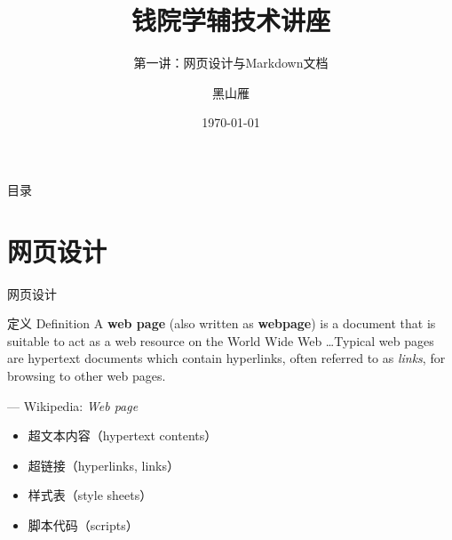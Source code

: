\documentclass{beamer}
\title[Tech Lec]{钱院学辅技术讲座}
\subtitle{第一讲：网页设计与Markdown文档}
\author[xjtu-blacksmith]{黑山雁}
\institute[Xi'an Jiaotong University]
{
  西安交通大学
}
\date{\today}
\begin{document}
\begin{frame}
\maketitle
\end{frame}

\begin{frame}{目录}
    \tableofcontents
\end{frame}

\section{网页设计}
\begin{frame}{网页设计}
\begin{block}{定义 Definition}
A \textbf{web page} (also written as \textbf{webpage}) is a document that is
suitable to act as a web resource on the World Wide Web \ldots Typical web pages
are hypertext documents which contain hyperlinks, often referred to as \emph{links},
for browsing to other web pages.

\raggedleft --- Wikipedia: \emph{Web page}
\end{block}

\begin{itemize}
    \item 超文本内容（hypertext contents）
    \item 超链接（hyperlinks, links）
    \item 样式表（style sheets）
    \item 脚本代码（scripts）
\end{itemize}
\end{frame}
\end{document}
